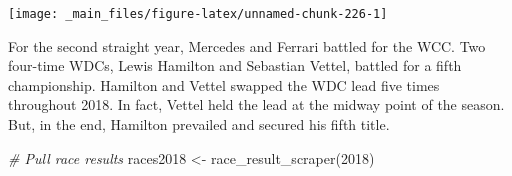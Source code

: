 \documentclass[
]{book}
\newenvironment{Shaded}{\begin{snugshade}}{\end{snugshade}}
\newcommand{\CommentTok}[1]{\textcolor[rgb]{0.56,0.35,0.01}{\textit{#1}}}
\newcommand{\DecValTok}[1]{\textcolor[rgb]{0.00,0.00,0.81}{#1}}
\newcommand{\FunctionTok}[1]{\textcolor[rgb]{0.00,0.00,0.00}{#1}}
\newcommand{\NormalTok}[1]{#1}
\newcommand{\OtherTok}[1]{\textcolor[rgb]{0.56,0.35,0.01}{#1}}
\begin{document}
\begin{center}\texttt{[image: \_main\_files/figure-latex/unnamed-chunk-226-1]} \end{center}

For the second straight year, Mercedes and Ferrari battled for the WCC. Two four-time WDCs, Lewis Hamilton and Sebastian Vettel, battled for a fifth championship. Hamilton and Vettel swapped the WDC lead five times throughout 2018. In fact, Vettel held the lead at the midway point of the season. But, in the end, Hamilton prevailed and secured his fifth title.

\begin{Shaded}
\begin{Highlighting}[]
\CommentTok{\# Pull race results}
\NormalTok{races2018 }\OtherTok{\textless{}{-}} \FunctionTok{race\_result\_scraper}\NormalTok{(}\DecValTok{2018}\NormalTok{)}


\end{Highlighting}
\end{Shaded}
\end{document}
